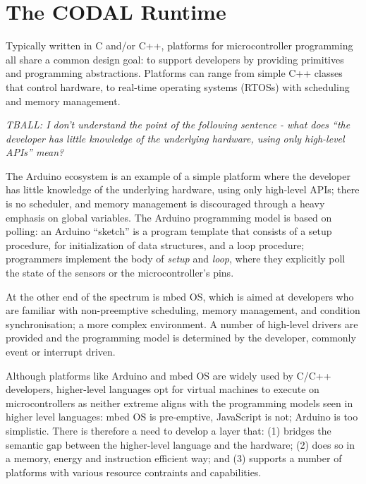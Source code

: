 \section{The CODAL Runtime}
\label{sec:codal}

Typically written in C and/or C++, platforms for microcontroller programming all share a common design goal: to support developers by providing primitives and programming abstractions. Platforms can range from simple C++ classes that control hardware, to real-time operating systems (RTOSs) with scheduling and memory management.

\emph{TBALL: I don't understand the point of the following sentence - what does
``the developer has little knowledge of the underlying hardware, using only high-level APIs''
mean?
 }
 
The Arduino ecosystem is an example of a simple platform where the developer has little knowledge of the underlying hardware, using only high-level APIs; there is no scheduler, and memory management is discouraged through a heavy emphasis on global variables.  The Arduino programming model is based on polling: an Arduino ``sketch'' is a program template that consists of a setup procedure, for initialization of data structures, and a loop procedure; programmers implement the body of \textit{setup} and \textit{loop}, where they explicitly poll the state of the sensors or the microcontroller's pins.

At the other end of the spectrum is mbed OS, which is aimed at developers who are familiar with non-preemptive scheduling, memory management, and condition synchronisation; a more complex environment. A number of high-level drivers are provided and the programming model is determined by the developer, commonly event or interrupt driven.

Although platforms like Arduino and mbed OS are widely used by C/C++ developers, higher-level languages opt for virtual machines to execute on microcontrollers as neither extreme aligns with the programming models seen in higher level languages: mbed OS is pre-emptive, JavaScript is not; Arduino is too simplistic. There is therefore a need to develop a layer that: (1) bridges the semantic gap between the higher-level language and the hardware; (2) does so in a memory, energy and instruction efficient way; and (3) supports a number of platforms with various resource contraints and capabilities.



